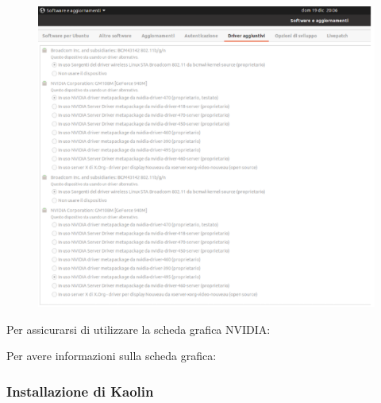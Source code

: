 \begin{figure}[ht!]
  \centering
  \includegraphics[scale=0.8]{Images/SizerPic/Sizer9.png}
    \label{fig:Sizer9}
\end{figure}

\medskip






\medskip

Per assicurarsi di utilizzare la scheda grafica NVIDIA:

\medskip




\medskip

Per avere informazioni sulla scheda grafica:

\medskip






\subsubsection{Installazione di Kaolin}

\medskip






